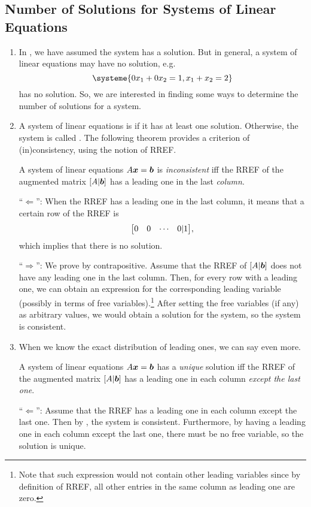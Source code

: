 \subsection{Number of Solutions for Systems of Linear Equations}
\label{subsect:sys-sol-num}
\begin{enumerate}
\item In , we have assumed the system has a
solution. But in general, a system of linear equations may have no solution,
e.g.
\[
\systeme{0x_1+0x_2=1,
x_1+x_2=2}
\]
has no solution. So, we are interested in finding some ways to determine the
number of solutions for a system.

\item A system of linear equations is  if it has at least one
solution. Otherwise, the system is called . The following
theorem provides a criterion of (in)consistency, using the notion of RREF.

\begin{theorem}
\label{thm:consist-criterion}
A system of linear equations \(A\vb*{x}=\vb*{b}\) is \emph{inconsistent} iff
the RREF of the augmented matrix \([A|\vb*{b}]\) has a leading one in the last
\emph{column}.
\end{theorem}
\begin{pf}
``\(\Leftarrow\)'': When the RREF has a leading one in the last column, it
means that a certain row of the RREF is
\[
\mqty[0&0&\cdots&0|1],
\]
which implies that there is no solution.

``\(\Rightarrow\)'': We prove by contrapositive. Assume that the RREF of
\([A|\vb*{b}]\) does not have any leading one in the last column. Then, for
every row with a leading one, we can obtain an expression for the corresponding
leading variable (possibly in terms of free variables).\footnote{Note that such
expression would not contain other leading variables since by definition of
RREF, all other entries in the same column as leading one are zero.} After
setting the free variables (if any) as arbitrary values, we would obtain a
solution for the system, so the system is consistent.
\end{pf}

\item When we know the exact distribution of leading ones, we can say even
more.
\begin{corollary}
\label{cor:unique-criterion}
A system of linear equations \(A\vb*{x}=\vb*{b}\) has a \emph{unique}
solution iff the RREF of the augmented matrix \([A|\vb*{b}]\) has a leading
one in each column \emph{except the last one}.
\end{corollary}
\begin{pf}
``\(\Leftarrow\)'': Assume that the RREF has a leading one in each column
except the last one. Then by , the system is
consistent. Furthermore, by having a leading one in each column except the
last one, there must be no free variable, so the solution is unique.


\end{pf}
\end{enumerate}
